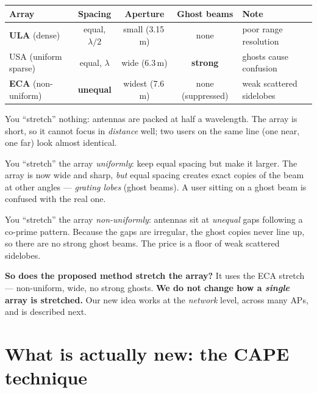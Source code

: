 \documentclass[11pt]{article}
\newcommand{\ula}{\textcolor{NavyBlue}{\textbf{ULA}}}
\newcommand{\eca}{\textcolor{BrickRed}{\textbf{ECA}}}
\begin{document}
\begin{center}
\renewcommand{\arraystretch}{1.2}
\begin{tabular}{@{}lcccp{4.3cm}@{}}
\toprule
Array & Spacing & Aperture & Ghost beams & Note\\
\midrule
\ula{} (dense)        & equal, $\lambda/2$ & small (3.15\,m) & none & poor range resolution\\
USA (uniform sparse)  & equal, $\lambda$   & wide (6.3\,m)   & \textbf{strong} & ghosts cause confusion\\
\eca{} (non-uniform)  & \textbf{unequal}   & widest (7.6\,m) & none (suppressed) & weak scattered sidelobes\\
\bottomrule
\end{tabular}
\end{center}

\begin{description}[leftmargin=0pt,itemsep=3pt]
\item[\textbf{ULA (old, dense).}] You ``stretch'' nothing: antennas are packed at half a
  wavelength. The array is short, so it cannot focus in \emph{distance} well; two users on the
  same line (one near, one far) look almost identical.
\item[\textbf{USA (old, uniform sparse).}] You ``stretch'' the array \emph{uniformly}: keep equal
  spacing but make it larger. The array is now wide and sharp, \emph{but} equal spacing creates
  exact copies of the beam at other angles --- \emph{grating lobes} (ghost beams). A user sitting
  on a ghost beam is confused with the real one.
\item[\textbf{ECA (the array we use, from the 2025 paper).}] You ``stretch'' the array
  \emph{non-uniformly}: antennas sit at \emph{unequal} gaps following a co-prime pattern. Because
  the gaps are irregular, the ghost copies never line up, so there are no strong ghost beams. The
  price is a floor of weak scattered sidelobes.
\end{description}

\begin{keybox}
\textbf{So does the proposed method stretch the array?} It uses the ECA stretch --- non-uniform,
wide, no strong ghosts. \textbf{We do not change how a \emph{single} array is stretched.} Our new
idea works at the \emph{network} level, across many APs, and is described next.
\end{keybox}

\section{What is actually new: the CAPE technique}
\end{document}

